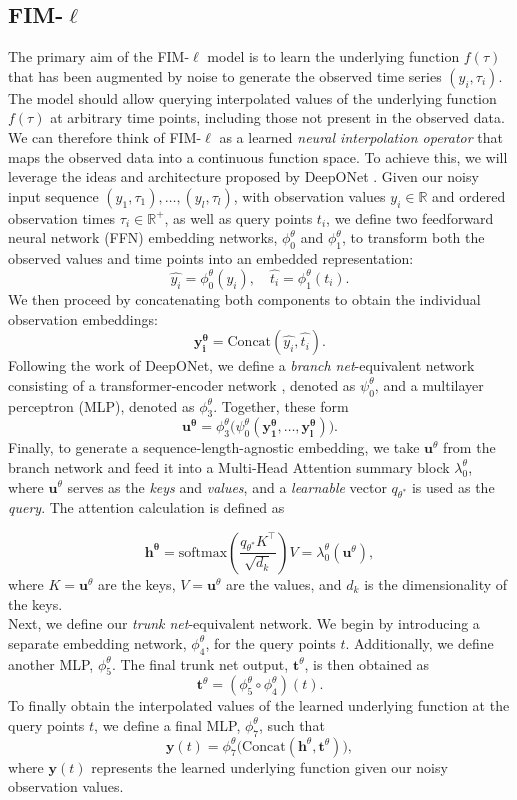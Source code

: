 \documentclass{article}
\theoremstyle{plain}
\theoremstyle{definition}
\theoremstyle{remark}
\begin{document}
\subsection{FIM-$\ell$}\label{sec:FIM-l}
The primary aim of the FIM-$\ell$ model is to learn the underlying function $f(\tau)$ that has been augmented by noise to generate the observed time series $(y_i, \tau_i)$. The model should allow querying interpolated values of the underlying function $f(\tau)$ at arbitrary time points, including those not present in the observed data.
We can therefore think of FIM-$\ell$ as a learned \emph{neural interpolation operator} that maps the observed data into a continuous function space. To achieve this, we will leverage the ideas and architecture proposed by DeepONet \cite{Deeponet}.
Given our noisy input sequence \((y_1, \tau_1), \ldots, (y_l, \tau_l)\), with observation values \(y_i \in \mathbb{R}\) and ordered observation times \(\tau_i \in \mathbb{R}^+\), as well as query points \(t_i\), we define two feedforward neural network (FFN) embedding networks, \(\phi^{\theta}_0\) and \(\phi^{\theta}_1\), to transform both the observed values and time points into an embedded representation:
\[
    \hat{y_i} = \phi^{\theta}_0(y_i), \quad
    \hat{t_i} = \phi^{\theta}_1(t_i).
\]
We then proceed by concatenating both components to obtain the individual observation embeddings:
\[
    \mathbf{y^{\theta}_i} = \text{Concat}(\hat{y_i}, \hat{t_i}).
\]
Following the work of DeepONet, we define a \emph{branch net}-equivalent network consisting of a transformer-encoder network \cite{vaswani2023attentionneed}, denoted as $\psi^{\theta}_0$, and a multilayer perceptron (MLP), denoted as $\phi^{\theta}_3$. Together, these form
\[
    \mathbf{u^{\theta}} = \phi^{\theta}_3\big(\psi^{\theta}_0(\mathbf{y^{\theta}_1}, \dots, \mathbf{y^{\theta}_l})\big).
\]
Finally, to generate a sequence-length-agnostic embedding, we take \(\mathbf{u}^{\theta}\) from the branch network and feed it into a Multi-Head Attention \cite{} summary block $\lambda^{\theta}_0$, where \(\mathbf{u}^{\theta}\) serves as the \emph{keys} and \emph{values}, and a \emph{learnable} vector \(q_{\theta^*}\) is used as the \emph{query}. The attention calculation is defined as 

\[
\mathbf{h^{\theta}} = \text{softmax}\left(\frac{q_{\theta^*} K^\top}{\sqrt{d_k}}\right) V = \lambda^{\theta}_0(\mathbf{u}^{\theta}),
\]
where \(K = \mathbf{u}^{\theta}\) are the keys, \(V = \mathbf{u}^{\theta}\) are the values, and \(d_k\) is the dimensionality of the keys.\\
Next, we define our \emph{trunk net}-equivalent network. We begin by introducing a separate embedding network, $\phi^{\theta}_4$, for the query points $t$. Additionally, we define another MLP, $\phi^{\theta}_5$. The final trunk net output, $\mathbf{t}^{\theta}$, is then obtained as
\[
    \mathbf{t}^{\theta} = (\phi^{\theta}_5 \circ \phi^{\theta}_4)(t).
\]
To finally obtain the interpolated values of the learned underlying function at the query points $t$, we define a final MLP, $\phi^{\theta}_7$, such that
\[
    \mathbf{y}(t) = \phi^{\theta}_7\big(\text{Concat}(\mathbf{h}^{\theta}, \mathbf{t}^{\theta})\big),
\]
where $\mathbf{y}(t)$ represents the learned underlying function given our noisy observation values.
\end{document}
